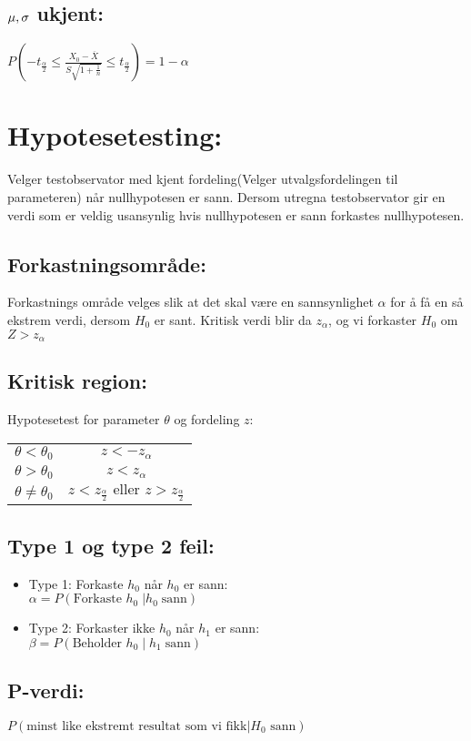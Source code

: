 \documentclass[12pt,a4paper,twocolumn,twoside]{article}
\begin{document}
\subsection*{$\bold{\mu,\sigma}$ ukjent:}
$P\left(-t_{\frac{\alpha}{2}}\leq\frac{X_0-\overline{X}}{S\sqrt{1+\frac{1}{n}}}\leq t_{\frac{\alpha}{2}}\right) = 1-\alpha$

%
%
\section*{Hypotesetesting:}
Velger testobservator med kjent fordeling(Velger utvalgsfordelingen til parameteren) når nullhypotesen er sann.
Dersom utregna testobservator gir en verdi som er veldig usansynlig hvis nullhypotesen er sann forkastes nullhypotesen.
\subsection*{Forkastningsområde:}
Forkastnings område velges slik at det skal være en sannsynlighet $\alpha$ for å få en så ekstrem verdi, dersom $H_0$ er sant.
Kritisk verdi blir da $z_\alpha$, og vi forkaster $H_0$ om $Z>z_\alpha$
\subsection*{Kritisk region:}
Hypotesetest for parameter $\theta$ og fordeling $z$:\\  
\begin{tabular}{|c|c|}
    $\theta<\theta_0$ & $z<-z_\alpha$ \\
    $\theta>\theta_0$ & $z<z_\alpha$ \\
    $\theta\neq\theta_0$ & $z<z_{\frac{\alpha}{2}} \text{ eller } z>z_{\frac{\alpha}{2}}$
\end{tabular}
\subsection*{Type 1 og type 2 feil:}
\begin{itemize}[topsep=0pt,itemsep=0pt, partopsep=0pt]
    \item Type 1: Forkaste $h_0$ når $h_0$ er sann:\\$\alpha = P(\text{Forkaste }h_0\;|h_0\;\text{sann})$
    \item Type 2: Forkaster ikke $h_0$ når $h_1$ er sann:\\$\beta = P(\text{Beholder }h_0\;|\;h_1\;\text{sann})$
\end{itemize}
\subsection*{P-verdi:}
$P(\text{minst like ekstremt resultat som vi fikk} | H_0 \text{ sann})$
\end{document}
